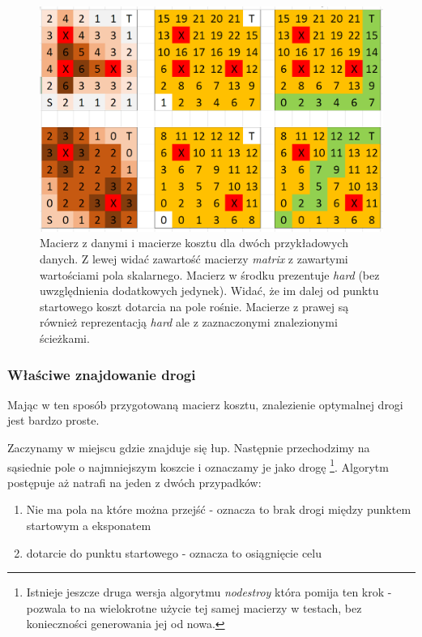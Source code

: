 \documentclass[12pt]{article}
\begin{document}
\begin{figure}[H]
\includegraphics[width=\textwidth,keepaspectratio=true]{Capture.png}
\caption{
Macierz z danymi i macierze kosztu dla dwóch przykładowych danych.
Z lewej widać zawartość macierzy \emph{matrix} z zawartymi wartościami pola skalarnego. Macierz w środku prezentuje \emph{hard} (bez uwzględnienia dodatkowych jedynek). Widać, że im dalej od punktu startowego koszt dotarcia na pole rośnie. Macierze z prawej są również reprezentacją \emph{hard} ale z zaznaczonymi znalezionymi ścieżkami.
}
\end{figure}	

	
\subsubsection{Właściwe znajdowanie drogi}	
Mając w ten sposób przygotowaną macierz kosztu, znalezienie optymalnej drogi jest bardzo proste.

Zaczynamy w miejscu gdzie znajduje się łup. Następnie przechodzimy na sąsiednie pole o najmniejszym koszcie i oznaczamy je jako drogę \footnote{Istnieje jeszcze druga wersja algorytmu \emph{no\textunderscore destroy} która pomija ten krok - pozwala to na wielokrotne użycie tej samej macierzy w testach, bez konieczności generowania jej od nowa.}. Algorytm postępuje aż natrafi na jeden z dwóch przypadków:
\begin{enumerate}
\item Nie ma pola na które można przejść - oznacza to brak drogi między punktem startowym a eksponatem
\item dotarcie do punktu startowego - oznacza to osiągnięcie celu
\end{enumerate}
\end{document}
